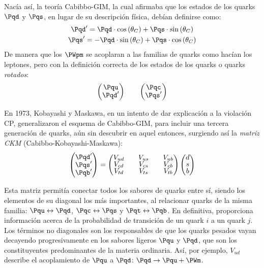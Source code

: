 Nacía así, la teoría Cabibbo-GIM, la cual afirmaba que los estados de los quarks $\Pqd$ y $\Pqs$, en lugar de su descripción física, debían definirse como:
\begin{equation}
\begin{gathered}
\Pqd'=\Pqd \cdot \cos \left( \theta _{C}\right) + \Pqs \cdot \sin \left( \theta _{C}\right) \\
\Pqs'= - \Pqd \cdot \sin \left( \theta _{C}\right) + \Pqs \cdot \cos \left( \theta_C\right)
\end{gathered}
\end{equation}
De manera que los $\PWpm$ se acoplaran a las familias de quarks como hacían los leptones, pero con la definición correcta de los estados de los quarks o quarks \textit{rotados}:
\begin{align}
\begingroup 
\renewcommand*{\arraystretch}{0.8}
\setlength\arraycolsep{10pt}
\begin{pmatrix} \Pqu \\ \Pqd' \end{pmatrix} \qquad
\begin{pmatrix} \Pqc \\ \Pqs' \end{pmatrix}
\endgroup
\end{align}

En 1973, Kobayashi y Maskawa, en un intento de dar explicación a la violación CP, generalizaron el esquema de Cabibbo-GIM, para incluir una tercera generación de quarks, aún sin descubrir en aquel entonces, surgiendo así la \textit{matriz CKM} (Cabibbo-Kobayashi-Maskawa):
\begin{equation}
\begingroup 
\renewcommand*{\arraystretch}{0.8}
\setlength\arraycolsep{10pt}
\begin{pmatrix} \Pqd' \\ \Pqs' \\ \Pqb' \end{pmatrix} =\begin{pmatrix} V_{ud} & V_{us} & V_{ub} \\ V_{cd} & V_{cs} & V_{cb} \\ V_{td} & V_{ts} & V_{tb} \end{pmatrix}\begin{pmatrix} d \\ s \\ b \end{pmatrix}
\endgroup\label{eq:CKM}
\end{equation}

Esta matriz permitía conectar todos los sabores de quarks entre sí, siendo los elementos de su diagonal los más importantes, al relacionar quarks de la misma familia: $\Pqu \leftrightarrow \Pqd$, $\Pqc \leftrightarrow \Pqs$ y $\Pqt \leftrightarrow \Pqb$. En definitiva, proporciona información acerca de la probabilidad de transición de un quark $i$ a un quark $j$. Los términos no diagonales son los responsables de que los quarks pesados vayan decayendo progresivamente en los sabores ligeros $\Pqu$ y $\Pqd$, que son los constituyentes predominantes de la materia ordinaria. Así, por ejemplo, $V_{ud}$ describe el acoplamiento de $\Pqu$ a $\Pqd$: $\Pqd \rightarrow \Pqu + \PWm$.

